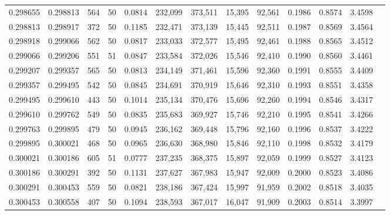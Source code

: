 \begin{tabular}{rrrrrrrrrrrrr}
0.298655 & 0.298813 &   564 &  50 &                                     0.0814 & 232,099 & 373,511 &  15,395 &  92,561 & 0.1986 & 0.8574 & 3.4598 \\
0.298813 & 0.298917 &   372 &  50 &                                     0.1185 & 232,471 & 373,139 &  15,445 &  92,511 & 0.1987 & 0.8569 & 3.4564 \\
0.298918 & 0.299066 &   562 &  50 &                                     0.0817 & 233,033 & 372,577 &  15,495 &  92,461 & 0.1988 & 0.8565 & 3.4512 \\
0.299066 & 0.299206 &   551 &  51 &                                     0.0847 & 233,584 & 372,026 &  15,546 &  92,410 & 0.1990 & 0.8560 & 3.4461 \\
0.299207 & 0.299357 &   565 &  50 &                                     0.0813 & 234,149 & 371,461 &  15,596 &  92,360 & 0.1991 & 0.8555 & 3.4409 \\
0.299357 & 0.299495 &   542 &  50 &                                     0.0845 & 234,691 & 370,919 &  15,646 &  92,310 & 0.1993 & 0.8551 & 3.4358 \\
0.299495 & 0.299610 &   443 &  50 &                                     0.1014 & 235,134 & 370,476 &  15,696 &  92,260 & 0.1994 & 0.8546 & 3.4317 \\
0.299610 & 0.299762 &   549 &  50 &                                     0.0835 & 235,683 & 369,927 &  15,746 &  92,210 & 0.1995 & 0.8541 & 3.4266 \\
0.299763 & 0.299895 &   479 &  50 &                                     0.0945 & 236,162 & 369,448 &  15,796 &  92,160 & 0.1996 & 0.8537 & 3.4222 \\
0.299895 & 0.300021 &   468 &  50 &                                     0.0965 & 236,630 & 368,980 &  15,846 &  92,110 & 0.1998 & 0.8532 & 3.4179 \\
0.300021 & 0.300186 &   605 &  51 &                                     0.0777 & 237,235 & 368,375 &  15,897 &  92,059 & 0.1999 & 0.8527 & 3.4123 \\
0.300186 & 0.300291 &   392 &  50 &                                     0.1131 & 237,627 & 367,983 &  15,947 &  92,009 & 0.2000 & 0.8523 & 3.4086 \\
0.300291 & 0.300453 &   559 &  50 &                                     0.0821 & 238,186 & 367,424 &  15,997 &  91,959 & 0.2002 & 0.8518 & 3.4035 \\
0.300453 & 0.300558 &   407 &  50 &                                     0.1094 & 238,593 & 367,017 &  16,047 &  91,909 & 0.2003 & 0.8514 & 3.3997 \\

\end{tabular}
